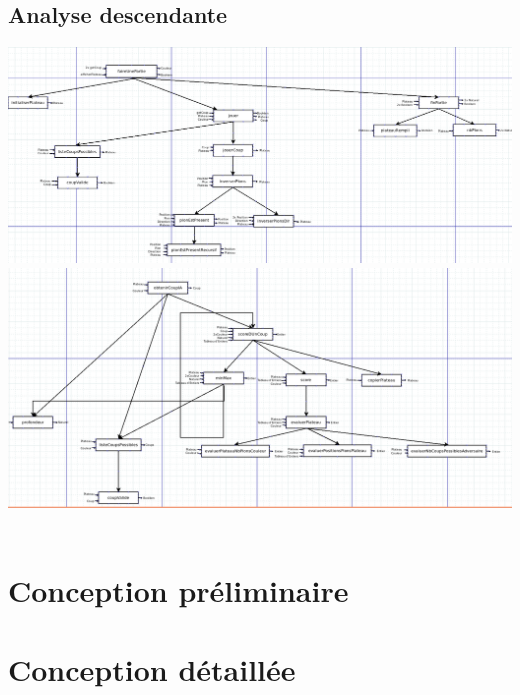 \documentclass[11pt]{report}
\begin{document}
\chapter{Analyse descendante}
\begin{landscape}
\includegraphics[scale=0.3]{Illustrations/FaireUnePartie.png} \\
\includegraphics[scale=0.3]{Illustrations/ObtenirCoupIA.png}\
\end{landscape}

\setcounter{chapter}{0}
\part{Conception préliminaire}


\setcounter{chapter}{0}
\part{Conception détaillée}


\setcounter{chapter}{0}
\end{document}
